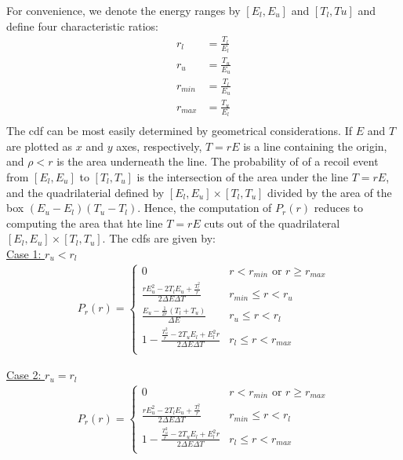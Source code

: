\documentclass[review]{elsarticle}
\begin{document}
For convenience, we denote the energy ranges by $[E_l, E_u]$ and $[T_l, Tu]$ and define four characteristic ratios:
\begin{align}
   r_l &= \frac{T_l}{E_l} \nonumber \\ 
   r_u &= \frac{T_u}{E_u} \nonumber \\ 
   r_{min} &= \frac{T_l}{E_u} \nonumber \\ 
   r_{max} &= \frac{T_u}{E_l} \nonumber \\ 
\end{align}
The cdf can be most easily determined by geometrical considerations. If $E$ and $T$ are plotted as $x$ and $y$ axes, respectively, $T=r E$ is a line containing the origin,
and $\rho < r$ is the area underneath the line. The probability of of a recoil event from $[E_l, E_u]$ to $[T_l, T_u]$ is the intersection of the area under the line $T=rE$, and the quadrilaterial defined by  $[E_l, E_u] \times [T_l, T_u]$ divided by the area of the box $(E_u - E_l)(T_u - T_l)$. Hence, the computation of $P_r(r)$ reduces to computing the area that hte line $T=rE$ cuts out of the quadrilateral $[E_l, E_u] \times [T_l, T_u]$. The cdfs are given by:\\

\underline{Case 1: $r_u < r_l$}
\begin{align*}
 P_r(r) =  \left\{ \begin{array}{ll}
         0 & r < r_{min} \text{ or }r \ge r_{max} \\
         \frac{r E_u^2 - 2 T_l E_u + \frac{T_l^2}{r}}{2 \Delta E \Delta T} &  r_{min} \le r < r_u \\
         \frac{E_u - \frac{1}{2r} (T_l + T_u)}{\Delta E} & r_u \le r < r_l \\
         1 - \frac{\frac{T_u^2}{r} - 2 T_u E_l + E_l^2 r}{2 \Delta E \Delta T} & r_l \le r < r_{max} \\
        \end{array} \right.
\end{align*}

\underline{Case 2: $r_u = r_l$}
\begin{align*}
 P_r(r) =  \left\{ \begin{array}{ll}
         0 & r < r_{min} \text{ or }r \ge r_{max} \\
         \frac{r E_u^2 - 2 T_l E_u + \frac{T_l^2}{r}}{2 \Delta E \Delta T} &  r_{min} \le r < r_l \\
         1 - \frac{\frac{T_u^2}{r} - 2 T_u E_l + E_l^2 r}{2 \Delta E \Delta T} & r_l \le r < r_{max} \\
        \end{array} \right.
\end{align*}
\end{document}
